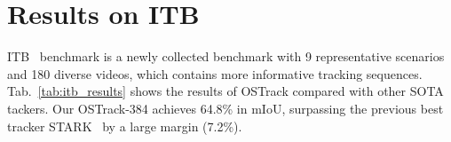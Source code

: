 \section{Results on ITB}
ITB~\cite{itb} benchmark is a newly collected benchmark with 9 representative scenarios and 180 diverse videos, which contains more informative tracking sequences. Tab.~\ref{tab:itb_results} shows the results of OSTrack compared with other SOTA tackers. Our OSTrack-384 achieves 64.8\% in mIoU, surpassing the previous best tracker STARK~\cite{stark} by a large margin (7.2\%).


\begin{table}[t!]
\centering
\caption{Comparison with state-of-the-arts on ITB~\cite{itb} benchmark. mIoU(\%) scores are reported. The best two results are shown in   and  fonts.}
\end{table}
